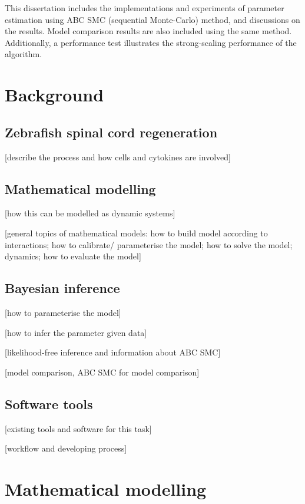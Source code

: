 \documentclass[12pt,a4paper]{report}
\begin{document}
This dissertation includes the implementations and experiments of parameter estimation using ABC SMC (sequential Monte-Carlo) method, and discussions on the results. Model comparison results are also included using the same method. Additionally, a performance test illustrates the strong-scaling performance of the algorithm.








\chapter{Background}

\section{Zebrafish spinal cord regeneration}

[describe the process and how cells and cytokines are involved]

\section{Mathematical modelling}

[how this can be modelled as dynamic systems]

[general topics of mathematical models: how to build model according to interactions; how to calibrate/ parameterise the model; how to solve the model; dynamics; how to evaluate the model]
 

\section{Bayesian inference}

[how to parameterise the model]

[how to infer the parameter given data]

[likelihood-free inference and information about ABC SMC]

[model comparison, ABC SMC for model comparison]

\section{Software tools}

[existing tools and software for this task]

[workflow and developing process]

\chapter{Mathematical modelling}
\end{document}
